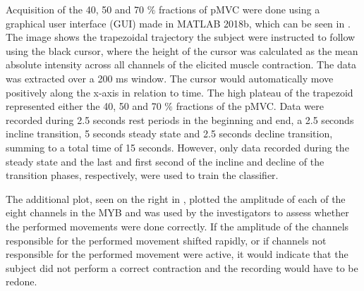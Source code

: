 Acquisition of the 40, 50 and 70 $\percent$ fractions of pMVC were done using a graphical user interface (GUI) made in MATLAB 2018b, which can be seen in . The image shows the trapezoidal trajectory the subject were instructed to follow using the black cursor, where the height of the cursor was calculated as the mean absolute intensity across all channels of the elicited muscle contraction. The data was extracted over a 200 ms window. The cursor would automatically move positively along the x-axis in relation to time. The high plateau of the trapezoid represented either the 40, 50 and 70 $\percent$ fractions of the pMVC. Data were recorded during 2.5 seconds rest periods in the beginning and end, a 2.5 seconds incline transition, 5 seconds steady state and 2.5 seconds decline transition, summing to a total time of 15 seconds. However, only data recorded during the steady state and the last and first second of the incline and decline of the transition phases, respectively, were used to train the classifier. 

The additional plot, seen on the right in , plotted the amplitude of each of the eight channels in the MYB and was used by the investigators to assess whether the performed movements were done correctly. If the amplitude of the channels responsible for the performed movement shifted rapidly, or if channels not responsible for the performed movement were active, it would indicate that the subject did not perform a correct contraction and the recording would have to be redone.   
   
   
